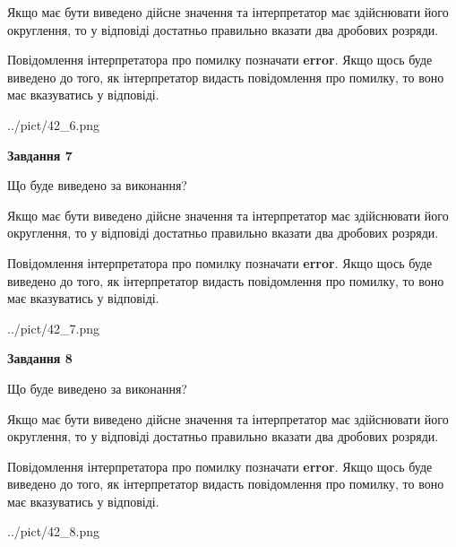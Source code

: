 \documentclass[12pt, ukrainian]{article}
\begin{document}
{\begin {Large}
Якщо має бути виведено дійсне значення та інтерпретатор має здійснювати його округлення, 
то у відповіді достатньо правильно вказати два дробових розряди.

Повідомлення інтерпретатора про помилку позначати \textbf{error}.
Якщо щось буде виведено до того, як інтерпретатор видасть повідомлення про помилку, 
то воно має вказуватись у відповіді. \par

\begin{center}
	{../pict/42_6.png}
\end{center}
\newpage

{\begin {center}\textbf{Завдання 7}\end {center}}\par
Що буде виведено за виконання? \par

Якщо має бути виведено дійсне значення та інтерпретатор має здійснювати його округлення, 
то у відповіді достатньо правильно вказати два дробових розряди.

Повідомлення інтерпретатора про помилку позначати \textbf{error}.
Якщо щось буде виведено до того, як інтерпретатор видасть повідомлення про помилку, 
то воно має вказуватись у відповіді. \par

\begin{center}
	{../pict/42_7.png}
\end{center}
\newpage

{\begin {center}\textbf{Завдання 8}\end {center}}\par
Що буде виведено за виконання? \par

Якщо має бути виведено дійсне значення та інтерпретатор має здійснювати його округлення, 
то у відповіді достатньо правильно вказати два дробових розряди.

Повідомлення інтерпретатора про помилку позначати \textbf{error}.
Якщо щось буде виведено до того, як інтерпретатор видасть повідомлення про помилку, 
то воно має вказуватись у відповіді. \par

\begin{center}
	{../pict/42_8.png}
\end{center}
\newpage


\end{Large}}
\end{document}
